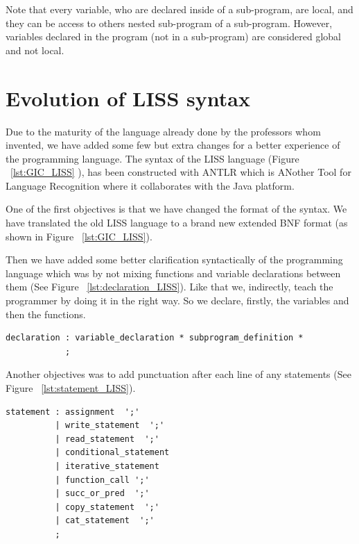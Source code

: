 \documentclass[
  oneside,
  11pt, a4paper,
  footinclude=true,
  headinclude=true,
  cleardoublepage=empty
]{scrbook}
\begin{document}
Note that every variable, who are declared inside of a sub-program, are local, and they can be access to others nested sub-program of a sub-program.
However, variables declared in the program (not in a sub-program) are considered global and not local.














\newpage



\section{Evolution of LISS syntax}
Due to the maturity of the language already done by the professors whom invented, we have added some few but extra changes for a better experience of the programming language.
The syntax of the LISS language (Figure ~\ref{lst:GIC_LISS} ), has been constructed with ANTLR which is ANother Tool for Language Recognition where it collaborates with the Java platform.

One of the first objectives is that we have changed the format of the syntax. We have translated the old LISS language to a brand new extended BNF format (as shown in Figure ~\ref{lst:GIC_LISS}).

Then we have added some better clarification syntactically of the programming language which was by not mixing functions and variable declarations between them (See Figure ~\ref{lst:declaration_LISS}).
Like that we, indirectly, teach the programmer by doing it in the right way. So we declare, firstly, the variables and then the functions.
\begin{lstlisting}[caption={},label={lst:declaration_LISS}]
declaration : variable_declaration * subprogram_definition *
            ;
\end{lstlisting}

Another objectives was to add punctuation after each line of any statements (See Figure ~\ref{lst:statement_LISS}).
\begin{lstlisting}[caption={Function statement},label={lst:statement_LISS}]
statement : assignment  ';'
          | write_statement  ';'
          | read_statement  ';'
          | conditional_statement
          | iterative_statement
          | function_call ';'
          | succ_or_pred  ';'
          | copy_statement  ';'
          | cat_statement  ';'
          ;
\end{lstlisting}
\end{document}

